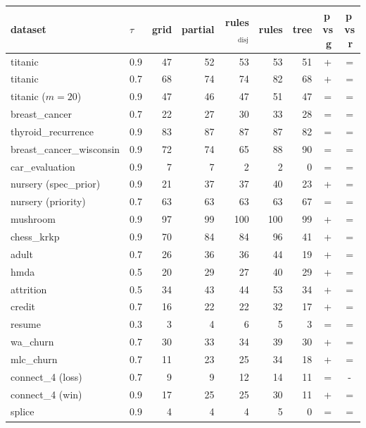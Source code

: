 \begin{tabular}{llrrrrrcc}
\toprule
dataset & $\tau$ & grid & partial & rules$_{\mathrm{disj}}$ & rules & tree & p$\,$vs$\,$g & p$\,$vs$\,$r\\
\midrule
titanic & 0.9 & 47 & 52 & 53 & 53 & 51 & + & =\\
titanic & 0.7 & 68 & 74 & 74 & 82 & 68 & + & =\\
titanic ($m{=}20$) & 0.9 & 47 & 46 & 47 & 51 & 47 & = & =\\
breast\_cancer & 0.7 & 22 & 27 & 30 & 33 & 28 & = & =\\
thyroid\_recurrence & 0.9 & 83 & 87 & 87 & 87 & 82 & = & =\\
breast\_cancer\_wisconsin & 0.9 & 72 & 74 & 65 & 88 & 90 & = & =\\
car\_evaluation & 0.9 & 7 & 7 & 2 & 2 & 0 & = & =\\
nursery (spec\_prior) & 0.9 & 21 & 37 & 37 & 40 & 23 & + & =\\
nursery (priority) & 0.7 & 63 & 63 & 63 & 63 & 67 & = & =\\
mushroom & 0.9 & 97 & 99 & 100 & 100 & 99 & + & =\\
chess\_krkp & 0.9 & 70 & 84 & 84 & 96 & 41 & + & =\\
adult & 0.7 & 26 & 36 & 36 & 44 & 19 & + & =\\
hmda & 0.5 & 20 & 29 & 27 & 40 & 29 & + & =\\
attrition & 0.5 & 34 & 43 & 44 & 53 & 34 & + & =\\
credit & 0.7 & 16 & 22 & 22 & 32 & 17 & + & =\\
resume & 0.3 & 3 & 4 & 6 & 5 & 3 & = & =\\
wa\_churn & 0.7 & 30 & 33 & 34 & 39 & 30 & + & =\\
mlc\_churn & 0.7 & 11 & 23 & 25 & 34 & 18 & + & =\\
connect\_4 (loss) & 0.7 & 9 & 9 & 12 & 14 & 11 & = & -\\
connect\_4 (win) & 0.9 & 17 & 25 & 25 & 30 & 11 & + & =\\
splice & 0.9 & 4 & 4 & 4 & 5 & 0 & = & =\\
\bottomrule
\end{tabular}
